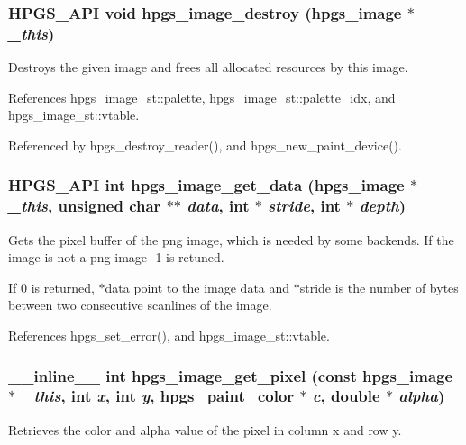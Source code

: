 \subsubsection[{hpgs\_\-image\_\-destroy}]{\setlength{\rightskip}{0pt plus 5cm}HPGS\_\-API void hpgs\_\-image\_\-destroy ({\bf hpgs\_\-image} $\ast$ {\em \_\-this})}\label{group__image_ga0be15914a56178078fc488e254949cc7}
Destroys the given image and frees all allocated resources by this image. 

References hpgs\_\-image\_\-st::palette, hpgs\_\-image\_\-st::palette\_\-idx, and hpgs\_\-image\_\-st::vtable.



Referenced by hpgs\_\-destroy\_\-reader(), and hpgs\_\-new\_\-paint\_\-device().

\subsubsection[{hpgs\_\-image\_\-get\_\-data}]{\setlength{\rightskip}{0pt plus 5cm}HPGS\_\-API int hpgs\_\-image\_\-get\_\-data ({\bf hpgs\_\-image} $\ast$ {\em \_\-this}, \/  unsigned char $\ast$$\ast$ {\em data}, \/  int $\ast$ {\em stride}, \/  int $\ast$ {\em depth})}\label{group__image_ga2240c492d0f359a24e3d01c5eff70a3b}
Gets the pixel buffer of the png image, which is needed by some backends. If the image is not a png image -\/1 is retuned.

If 0 is returned, $\ast$data point to the image data and $\ast$stride is the number of bytes between two consecutive scanlines of the image. 

References hpgs\_\-set\_\-error(), and hpgs\_\-image\_\-st::vtable.

\subsubsection[{hpgs\_\-image\_\-get\_\-pixel}]{\setlength{\rightskip}{0pt plus 5cm}\_\-\_\-inline\_\-\_\- int hpgs\_\-image\_\-get\_\-pixel (const {\bf hpgs\_\-image} $\ast$ {\em \_\-this}, \/  int {\em x}, \/  int {\em y}, \/  {\bf hpgs\_\-paint\_\-color} $\ast$ {\em c}, \/  double $\ast$ {\em alpha})\hspace{0.3cm}{\ttfamily  [static]}}\label{group__image_ga05c2b3b1f31abd151367019a8353f1f6}
Retrieves the color and alpha value of the pixel in column {\ttfamily x} and row {\ttfamily y}. 

